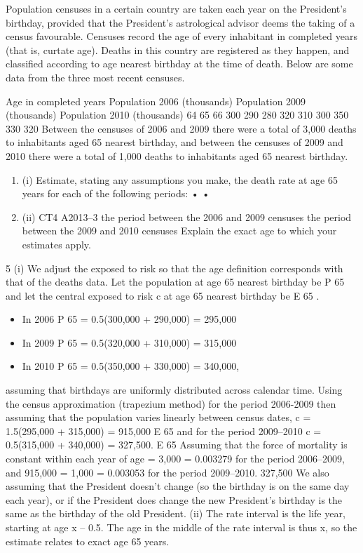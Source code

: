 \documentclass[a4paper,12pt]{article}
\begin{document}
Population censuses in a certain country are taken each year on the President’s birthday, provided that the President’s astrological advisor deems the taking of a census favourable. Censuses record the age of every inhabitant in completed years (that is, curtate age). Deaths in this country are registered as they happen, and classified according to age nearest birthday at the time of death.
Below are some data from the three most recent censuses.

Age in
completed
years Population
2006
(thousands) Population
2009
(thousands) Population
2010
(thousands)
64
65
66 300
290
280 320
310
300 350
330
320
Between the censuses of 2006 and 2009 there were a total of 3,000 deaths to
inhabitants aged 65 nearest birthday, and between the censuses of 2009 and 2010
there were a total of 1,000 deaths to inhabitants aged 65 nearest birthday.
\begin{enumerate}
\item (i)
Estimate, stating any assumptions you make, the death rate at age 65 years for
each of the following periods:
•
•
\item (ii)
CT4 A2013–3
the period between the 2006 and 2009 censuses
the period between the 2009 and 2010 censuses
Explain the exact age to which your estimates apply.
\end{enumerate}



5
(i)
We adjust the exposed to risk so that the age definition corresponds with that of the
deaths data.
Let the population at age 65 nearest birthday be P 65 and let the central exposed to risk
c
at age 65 nearest birthday be E 65
.


\begin{itemize}
\item In 2006 P 65 = 0.5(300,000 + 290,000) = 295,000
\item In 2009 P 65 = 0.5(320,000 + 310,000) = 315,000
\item In 2010 P 65 = 0.5(350,000 + 330,000) = 340,000,
\end{itemize}
assuming that birthdays are uniformly distributed across calendar time.
Using the census approximation (trapezium method) for the period 2006-2009 then assuming that the population varies linearly between census dates,
c
= 1.5(295,000 + 315,000) = 915,000
E 65
and for the period 2009–2010
c
= 0.5(315,000 + 340,000) = 327,500.
E 65
Assuming that the force of mortality is constant within each year of age
 = 3,000
= 0.003279 for the period 2006–2009, and
915,000
 = 1,000
= 0.003053 for the period 2009–2010.
327,500
We also assuming that the President doesn't change (so the birthday is on the same
day each year), or if the President does change the new President’s birthday is the
same as the birthday of the old President.
(ii)
The rate interval is the life year, starting at age x – 0.5.
The age in the middle of the rate interval is thus x, so the estimate relates
to exact age 65 years.
\end{document}
